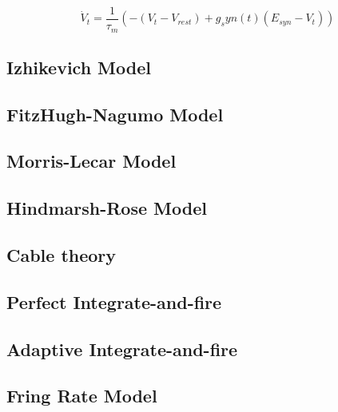 \begin{equation}\label{eq:lif}
    \dot V_t = \frac{1}{\tau_m}(-(V_t-V_{rest})+g_syn(t)(E_{syn}-V_t))
\end{equation}


\subsection{Izhikevich Model}


\subsection{FitzHugh-Nagumo Model}

\subsection{Morris-Lecar Model}

\subsection{Hindmarsh-Rose Model}

\subsection{Cable theory}

\subsection{Perfect Integrate-and-fire}


\subsection{Adaptive Integrate-and-fire}

\subsection{Fring Rate Model}


